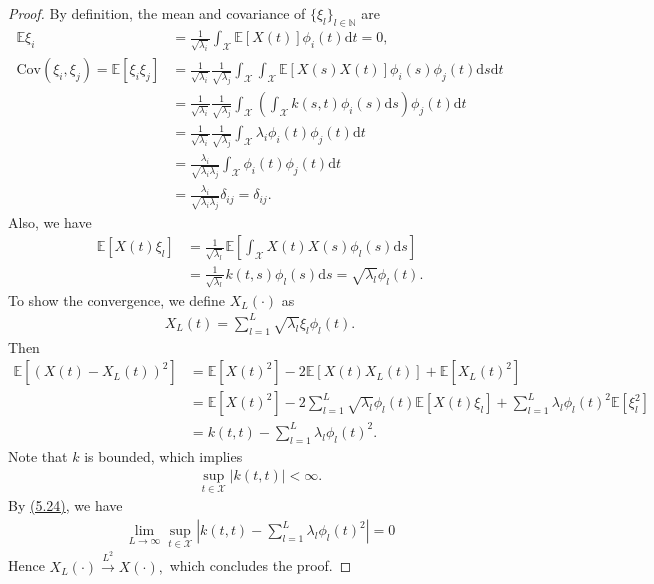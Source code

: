\documentclass{article}
\newcommand{\E}{\mathbb{E}}
\begin{document}
\begin{proof}
By definition, the mean and covariance of $\{\xi_l\}_{l\in\mathbb{N}}$ are
\begin{align*}
	\mathbb{E}\xi_i &= \frac{1}{\sqrt{\lambda_i}}\int_{\mathcal{X}} \E[X(t)]\phi_i(t)\mathrm{d}t=0,\tag{7.5}\\
	\mathrm{Cov}(\xi_i,\xi_{j}) = \mathbb{E}[\xi_i\xi_j] &= \frac{1}{\sqrt{\lambda_i}}\frac{1}{\sqrt{\lambda_j}}\int_\mathcal{X}\int_\mathcal{X}\mathbb{E}[X(s)X(t)]\phi_i(s)\phi_j(t)\mathrm{d}s\mathrm{d}t \\
	&= \frac{1}{\sqrt{\lambda_i}}\frac{1}{\sqrt{\lambda_j}}\int_\mathcal{X}\left(\int_\mathcal{X}k(s,t)\phi_i(s)\mathrm{d}s\right)\phi_j(t)\mathrm{d}t\\
	&= \frac{1}{\sqrt{\lambda_i}}\frac{1}{\sqrt{\lambda_j}}\int_\mathcal{X}\lambda_i\phi_i(t)\phi_j(t)\mathrm{d}t\\
	& = \frac{\lambda_i}{\sqrt{\lambda_i\lambda_j}}\int_\mathcal{X}\phi_i(t)\phi_j(t)\mathrm{d}t\\
	& = \frac{\lambda_i}{\sqrt{\lambda_i\lambda_j}}\delta_{ij} = \delta_{ij}.\tag{7.6}
\end{align*}
Also, we have
\begin{align*}
	\mathbb{E}[X(t)\xi_l] &= \frac{1}{\sqrt{\lambda_l}}\mathbb{E}\left[\int_\mathcal{X} X(t)X(s)\phi_l(s)\mathrm{d}s\right]\\
	&= \frac{1}{\sqrt{\lambda_l}}k(t,s)\phi_l(s)\mathrm{d}s = \sqrt{\lambda_l}\phi_l(t).\tag{7.7}
\end{align*}
To show the convergence, we define $X_L(\cdot)$ as
\begin{align*}
	X_L(t) = \sum_{l=1}^L\sqrt{\lambda_l}\xi_l\phi_l(t).\tag{7.8}
\end{align*}
Then
\begin{align*}
	\mathbb{E}\left[\left(X(t) - X_L(t)\right)^2\right] &= \mathbb{E}\left[X(t)^2\right] -  2\mathbb{E}\left[X(t)X_L(t)\right] + \mathbb{E}\left[X_L(t)^2\right]\\
	&= \mathbb{E}\left[X(t)^2\right] -  2\sum_{l=1}^L\sqrt{\lambda_l}\phi_l(t)\mathbb{E}\left[X(t)\xi_l\right] + \sum_{l=1}^L\lambda_l\phi_l(t)^2\mathbb{E}[\xi_l^2]\\
	&= k(t,t) - \sum_{l=1}^L\lambda_l\phi_l(t)^2.\tag{7.9}
\end{align*}
Note that $k$ is bounded, which implies
\begin{align*}
	\sup_{t\in\mathcal{X}}\left\vert k(t,t)\right\vert < \infty.\tag{7.10}
\end{align*}
By \hyperref[eq:5.24]{(5.24)}, we have	
\begin{align*}
	\lim_{L\to\infty}\sup_{t\in\mathcal{X}}\left\vert k(t,t) - \sum_{l=1}^L\lambda_l\phi_l(t)^2\right\vert = 0\tag{7.11}
\end{align*}
Hence $X_L(\cdot)\overset{L^2}{\to}X(\cdot),$ which concludes the proof.
\end{proof} 
\end{document}
